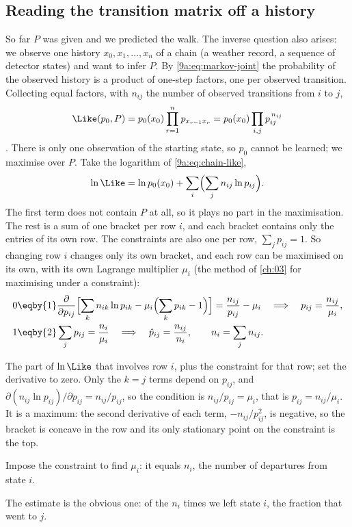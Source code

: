 \subsection{Reading the transition matrix off a history}
\label{9a:sec:mle}

So far $P$ was given and we predicted the walk. The inverse question also arises: we observe
one history $x_0,x_1,\dots,x_n$ of a chain (a weather record, a sequence of detector states)
and want to infer $P$. By \eqref{9a:eq:markov-joint} the probability of the observed history is
a product of one-step factors, one per observed transition. Collecting equal factors, with
$n_{ij}$ the number of observed transitions from $i$ to $j$,
\begin{equation}
  \Like(p_0,P)=p_0(x_0)\prod_{r=1}^{n}p_{x_{r-1}x_r}=p_0(x_0)\prod_{i,j}p_{ij}^{\,n_{ij}}
  \label{9a:eq:chain-like}
\end{equation}
. There is only one observation of the starting state, so $p_0$ cannot be
learned; we maximise over $P$. Take the logarithm of \eqref{9a:eq:chain-like},
\begin{equation*}
  \ln\Like=\ln p_0(x_0)+\sum_i\Bigl(\sum_jn_{ij}\ln p_{ij}\Bigr).
\end{equation*}
The first term does not contain $P$ at all, so it plays no part in the maximisation. The rest is
a sum of one bracket per row $i$, and each bracket contains only the entries of its own row.
The constraints are also one per row, $\sum_jp_{ij}=1$. So changing row $i$ changes only its
own bracket, and each row can be maximised on its own, with its own Lagrange multiplier
$\mu_i$ (the method of \cref{ch:03} for maximising under a constraint):
\begin{align}
  0&\eqby{1}\frac{\partial}{\partial p_{ij}}\Bigl[\sum_kn_{ik}\ln p_{ik}-\mu_i\Bigl(\sum_kp_{ik}-1\Bigr)\Bigr]
   =\frac{n_{ij}}{p_{ij}}-\mu_i
   \quad\Longrightarrow\quad p_{ij}=\frac{n_{ij}}{\mu_i}, \nonumber\\
  1&\eqby{2}\sum_jp_{ij}=\frac{n_i}{\mu_i}
   \quad\Longrightarrow\quad
   \hat p_{ij}=\frac{n_{ij}}{n_i},\qquad n_i=\sum_jn_{ij}.
  \label{9a:eq:chain-mle}
\end{align}
\begin{explain}
  \item The part of $\ln\Like$ that involves row $i$, plus the constraint for that row; set
        the derivative to zero. Only the $k=j$ terms depend on $p_{ij}$, and
        $\partial(n_{ij}\ln p_{ij})/\partial p_{ij}=n_{ij}/p_{ij}$, so the condition is
        $n_{ij}/p_{ij}=\mu_i$, that is $p_{ij}=n_{ij}/\mu_i$. It is a maximum: the second
        derivative of each term, $-n_{ij}/p_{ij}^2$, is negative, so the bracket is concave in
        the row and its only stationary point on the constraint is the top.
  \item Impose the constraint to find $\mu_i$: it equals $n_i$, the number of departures from
        state $i$.
\end{explain}
The estimate is the obvious one: of the $n_i$ times we left state $i$, the fraction that went
to $j$.

